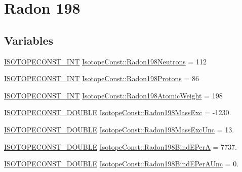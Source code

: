 \hypertarget{group___isotope_const-_radon-_rn198}{}\section{Radon 198}
\label{group___isotope_const-_radon-_rn198}
\subsection*{Variables}
\begin{DoxyCompactItemize}
\item 
\mbox{\hyperlink{group___isotope_const-_macros_ga5f18360b3e99483a35c32d789e62621c}{I\+S\+O\+T\+O\+P\+E\+C\+O\+N\+S\+T\+\_\+\+I\+NT}} \mbox{\hyperlink{group___isotope_const-_radon-_rn198_ga382033795f64831f0da803ed9857df7f}{Isotope\+Const\+::\+Radon198\+Neutrons}} = 112
\item 
\mbox{\hyperlink{group___isotope_const-_macros_ga5f18360b3e99483a35c32d789e62621c}{I\+S\+O\+T\+O\+P\+E\+C\+O\+N\+S\+T\+\_\+\+I\+NT}} \mbox{\hyperlink{group___isotope_const-_radon-_rn198_gad472aeff5367242c2a4cee3e41c3d2dd}{Isotope\+Const\+::\+Radon198\+Protons}} = 86
\item 
\mbox{\hyperlink{group___isotope_const-_macros_ga5f18360b3e99483a35c32d789e62621c}{I\+S\+O\+T\+O\+P\+E\+C\+O\+N\+S\+T\+\_\+\+I\+NT}} \mbox{\hyperlink{group___isotope_const-_radon-_rn198_gaac8b617abc890fb8fec2d14ba4e56774}{Isotope\+Const\+::\+Radon198\+Atomic\+Weight}} = 198
\item 
\mbox{\hyperlink{group___isotope_const-_macros_ga8f45a7272ce02c0b4c65c44636ed719a}{I\+S\+O\+T\+O\+P\+E\+C\+O\+N\+S\+T\+\_\+\+D\+O\+U\+B\+LE}} \mbox{\hyperlink{group___isotope_const-_radon-_rn198_ga2f22f1b933186bd268cf487242b2fbe5}{Isotope\+Const\+::\+Radon198\+Mass\+Exc}} = -\/1230.
\item 
\mbox{\hyperlink{group___isotope_const-_macros_ga8f45a7272ce02c0b4c65c44636ed719a}{I\+S\+O\+T\+O\+P\+E\+C\+O\+N\+S\+T\+\_\+\+D\+O\+U\+B\+LE}} \mbox{\hyperlink{group___isotope_const-_radon-_rn198_ga747e960b1fd23b7b563309f7966e6269}{Isotope\+Const\+::\+Radon198\+Mass\+Exc\+Unc}} = 13.
\item 
\mbox{\hyperlink{group___isotope_const-_macros_ga8f45a7272ce02c0b4c65c44636ed719a}{I\+S\+O\+T\+O\+P\+E\+C\+O\+N\+S\+T\+\_\+\+D\+O\+U\+B\+LE}} \mbox{\hyperlink{group___isotope_const-_radon-_rn198_ga89139d5afd7afb5dd35aa536dd69cbc9}{Isotope\+Const\+::\+Radon198\+Bind\+E\+PerA}} = 7737.
\item 
\mbox{\hyperlink{group___isotope_const-_macros_ga8f45a7272ce02c0b4c65c44636ed719a}{I\+S\+O\+T\+O\+P\+E\+C\+O\+N\+S\+T\+\_\+\+D\+O\+U\+B\+LE}} \mbox{\hyperlink{group___isotope_const-_radon-_rn198_ga04543a438d90e8d27cd6a47e9153c8d5}{Isotope\+Const\+::\+Radon198\+Bind\+E\+Per\+A\+Unc}} = 0.

\end{DoxyCompactItemize}
